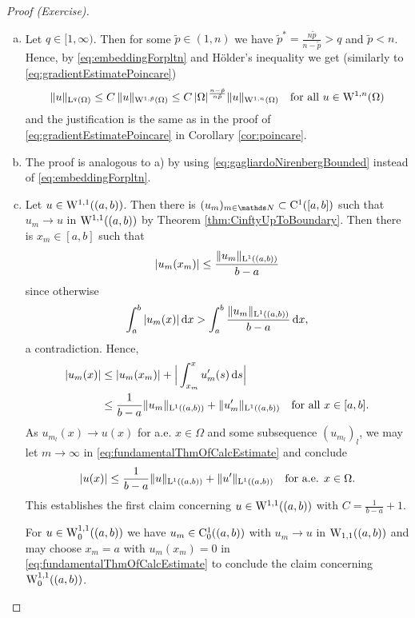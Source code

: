 \begin{proof}[Proof (Exercise)]
  \begin{enumerate}[a)]
    \item Let $q \in [1,\infty)$.
      Then for some $\tilde p \in (1,n)$ we have $\tilde p^* = \frac{n \tilde p}{n - \tilde p} > q$ and $\tilde p < n$.
      Hence, by \eqref{eq:embeddingForpltn} and Hölder's inequality we get (similarly to \eqref{eq:gradientEstimatePoincare})
      $$
      \|u\|_{\mathrm{L}^q(\Omega)} 
      \leq C\, \|u\|_{\mathrm{W}^{1,\tilde p}(\Omega)} 
      \leq C\, |\Omega|^{\frac{n - \tilde p}{n \tilde p}} \|u\|_{\mathrm{W}^{1,n}(\Omega)} \quad\text{for all } u \in \mathrm{W}^{1,n}(\Omega)
      $$
      and the justification is the same as in the proof of \eqref{eq:gradientEstimatePoincare} in Corollary \ref{cor:poincare}.

    \item The proof is analogous to a) by using \eqref{eq:gagliardoNirenbergBounded} instead of \eqref{eq:embeddingForpltn}.

    \item Let $u \in \mathrm{W}^{1,1}((a,b))$.
      Then there is $(u_m)_{m \in \N} \subset \CC^1([a,b])$ such that $u_m \to u$ in $\mathrm{W}^{1,1}((a,b))$ by Theorem \ref{thm:CinftyUpToBoundary}.
      Then there is $x_m \in [a,b]$ such that
      $$
      |u_m(x_m)| \leq \frac{\|u_m\|_{\mathrm{L}^1((a,b))}}{b - a}
      $$
      since otherwise 
      $$\int_a^b|u_m(x)| \, {\operatorname{d}\!{x}} > \int_a^b \frac{\|u_m\|_{\mathrm{L}^1((a,b))}}{b - a} \, {\operatorname{d}\!{x}},$$
      a contradiction. 
      Hence,
      \begin{equation}
        \label{eq:fundamentalThmOfCalcEstimate}
        \begin{split}
        |u_m(x)| 
          &\leq |u_m(x_m)| + \Big| \int_{x_m}^x u_m'(s) \, {\operatorname{d}\!{s}} \Big| \\
          & \leq \frac{1}{b - a} \| u_m\|_{\mathrm{L}^1((a,b))} + \|u_m'\|_{\mathrm{L}^1((a,b))} \quad\text{for all } x \in [a,b].
        \end{split}
      \end{equation}
      As $u_{m_l}(x) \to u(x)$ for a.e. $x \in \Omega$ and some subsequence $(u_{m_l})_l$, we may let $m \to \infty$ in \eqref{eq:fundamentalThmOfCalcEstimate} and conclude
      $$
      |u(x)| \leq \frac{1}{b - a} \|u\|_{\mathrm{L}^1((a,b))} + \|u'\|_{\mathrm{L}^1((a,b))} \quad\text{for a.e. } x \in \Omega.
      $$
      This establishes the first claim concerning $u \in \mathrm{W}^{1,1}((a,b))$ with $C = \frac{1}{b - a} + 1$.

      For $u \in \mathrm{W}_0^{1,1}((a,b))$ we have $u_m \in \mathrm{C}_0^1((a,b))$ with $u_m \to u$ in $\mathrm{W}_{1,1}((a,b))$ and may choose $x_m = a$ with $u_m(x_m) = 0$ in \eqref{eq:fundamentalThmOfCalcEstimate} to conclude the claim concerning $\mathrm{W}_0^{1,1}((a,b))$. \qedhere
  \end{enumerate}
\end{proof}

